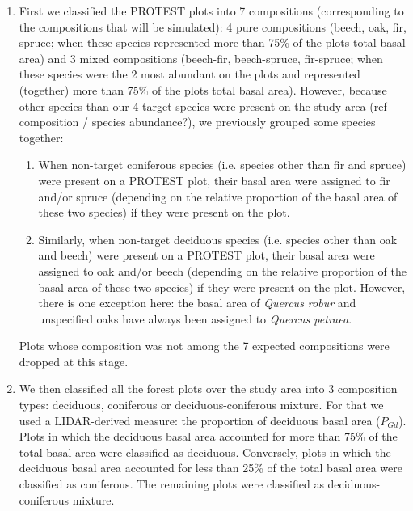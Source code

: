 \documentclass[a4paper]{article}
\begin{document}
\begin{enumerate}

    \item First we classified the PROTEST plots into 7 compositions (corresponding to the compositions that will be simulated): 4 pure compositions (beech, oak, fir, spruce; when these species represented more than 75\% of the plots total basal area) and 3 mixed compositions (beech-fir, beech-spruce, fir-spruce; when these species were the 2 most abundant on the plots and represented (together) more than 75\% of the plots total basal area). However, because other species than our 4 target species were present on the study area (ref composition / species abundance?), we previously grouped some species together:

    \begin{enumerate}

        \item When non-target coniferous species (i.e. species other than fir and spruce) were present on a PROTEST plot, their basal area were assigned to fir and/or spruce (depending on the relative proportion of the basal area of these two species) if they were present on the plot.

        \item Similarly, when non-target deciduous species (i.e. species other than oak and beech) were present on a PROTEST plot, their basal area were assigned to oak and/or beech (depending on the relative proportion of the basal area of these two species) if they were present on the plot. However, there is one exception here: the basal area of \textit{Quercus robur} and unspecified oaks have always been assigned to \textit{Quercus petraea}.

    \end{enumerate}

    Plots whose composition was not among the 7 expected compositions were dropped at this stage.

    \item We then classified all the forest plots over the study area into 3 composition types: deciduous, coniferous or deciduous-coniferous mixture. For that we used a LIDAR-derived measure: the proportion of deciduous basal area ($P_{Gd}$). Plots in which the deciduous basal area accounted for more than 75\% of the total basal area were classified as deciduous. Conversely, plots in which the deciduous basal area accounted for less than 25\% of the total basal area were classified as coniferous. The remaining plots were classified as deciduous-coniferous mixture.


\end{enumerate}
\end{document}
